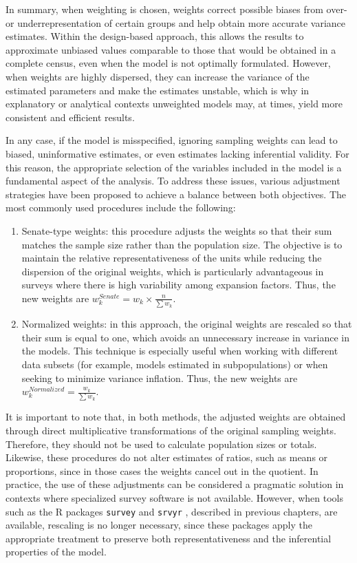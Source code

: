 \documentclass[
  english,
  12pt,
]{book}
\begin{document}
In summary, when weighting is chosen, weights correct possible biases from over- or underrepresentation of certain groups and help obtain more accurate variance estimates. Within the design-based approach, this allows the results to approximate unbiased values comparable to those that would be obtained in a complete census, even when the model is not optimally formulated. However, when weights are highly dispersed, they can increase the variance of the estimated parameters and make the estimates unstable, which is why in explanatory or analytical contexts unweighted models may, at times, yield more consistent and efficient results.

In any case, if the model is misspecified, ignoring sampling weights can lead to biased, uninformative estimates, or even estimates lacking inferential validity. For this reason, the appropriate selection of the variables included in the model is a fundamental aspect of the analysis. To address these issues, various adjustment strategies have been proposed to achieve a balance between both objectives. The most commonly used procedures include the following:

\begin{enumerate}
\def\labelenumi{\arabic{enumi}.}
\item
  Senate-type weights: this procedure adjusts the weights so that their sum matches the sample size rather than the population size. The objective is to maintain the relative representativeness of the units while reducing the dispersion of the original weights, which is particularly advantageous in surveys where there is high variability among expansion factors. Thus, the new weights are \(w_k^{Senate} = w_k \times \frac{n}{\sum w_k}\).
\item
  Normalized weights: in this approach, the original weights are rescaled so that their sum is equal to one, which avoids an unnecessary increase in variance in the models. This technique is especially useful when working with different data subsets (for example, models estimated in subpopulations) or when seeking to minimize variance inflation. Thus, the new weights are \(w_k^{Normalized} = \frac{w_k}{\sum w_k}\).
\end{enumerate}

It is important to note that, in both methods, the adjusted weights are obtained through direct multiplicative transformations of the original sampling weights. Therefore, they should not be used to calculate population sizes or totals. Likewise, these procedures do not alter estimates of ratios, such as means or proportions, since in those cases the weights cancel out in the quotient. In practice, the use of these adjustments can be considered a pragmatic solution in contexts where specialized survey software is not available. However, when tools such as the R packages \texttt{survey} \citep{Lumley2024} and \texttt{srvyr} \citep{Freedman2024}, described in previous chapters, are available, rescaling is no longer necessary, since these packages apply the appropriate treatment to preserve both representativeness and the inferential properties of the model.
\end{document}

